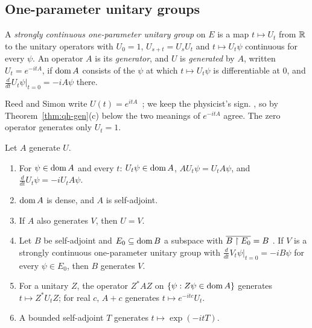 \begin{vetqenv}
\subsection{One-parameter unitary groups}\label{sec:qh-groups}

\begin{definition}\label{def:qh-group}
A \emph{strongly continuous one-parameter unitary group} on $E$ is a map $t\mapsto U_t$ from $\mathbb R$ to the unitary operators
with $U_0=1$, $U_{s+t}=U_sU_t$ and $t\mapsto U_t\psi$ continuous for every $\psi$. An operator $A$ is its \emph{generator},
and $U$ is \emph{generated} by $A$, written $U_t=e^{-itA}$, if $\operatorname{dom} A$ consists of the $\psi$ at which $t\mapsto U_t\psi$ is
differentiable at $0$, and $\frac d{dt}U_t\psi|_{t=0}=-iA\psi$ there.
\end{definition}

 Reed and Simon write $U(t)=e^{itA}$~\cite[]{rs1}; we keep the physicist's sign. , so by Theorem~\ref{thm:qh-gen}(c) below the two meanings of $e^{-itA}$ agree. The zero
operator generates only $U_t=1$.

\begin{theorem}[Generators]\label{thm:qh-gen}
Let $A$ generate $U$.
\begin{enumerate}
\item[(a)] For $\psi\in\operatorname{dom} A$ and every $t$: $U_t\psi\in\operatorname{dom} A$, $AU_t\psi=U_tA\psi$, and $\frac d{dt}U_t\psi=-iU_tA\psi$.
\item[(b)] $\operatorname{dom} A$ is dense, and $A$ is self-adjoint.
\item[(c)] If $A$ also generates $V$, then $U=V$.
\item[(d)] Let $B$ be self-adjoint and $E_0\subseteq\operatorname{dom} B$ a subspace with $\overline{B\restriction E_0}=B$ . If $V$ is a strongly continuous one-parameter unitary group with $\frac d{dt}V_t\psi|_{t=0}=-iB\psi$ for every
$\psi\in E_0$, then $B$ generates $V$.
\item[(e)] For a unitary $Z$, the operator $Z^*AZ$ on $\{\psi:Z\psi\in\operatorname{dom} A\}$ generates $t\mapsto Z^*U_tZ$; for real $c$,
$A+c$ generates $t\mapsto e^{-itc}U_t$.
\item[(f)] A bounded self-adjoint $T$ generates $t\mapsto\exp(-itT)$.
\end{enumerate}
\end{theorem}


\end{vetqenv}
